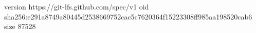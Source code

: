 version https://git-lfs.github.com/spec/v1
oid sha256:e291a8749a80445d2538669752cac5c7620364f15223308ff985aa198520cab6
size 87528
